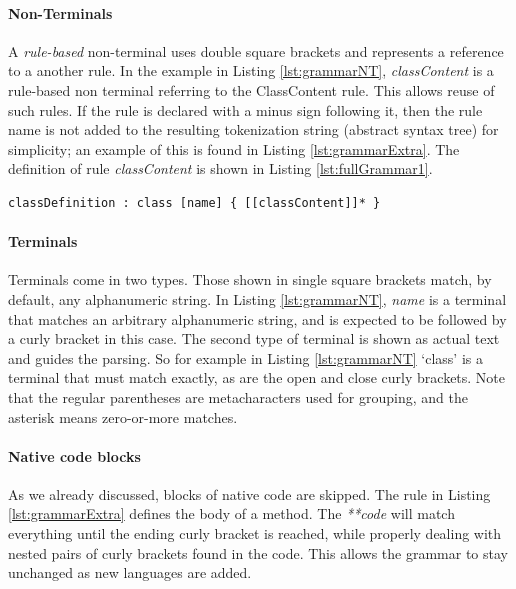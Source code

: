 \paragraph*{Non-Terminals} A \textit{rule-based} non-terminal uses double square brackets and represents a reference to a another rule. In the example in Listing \ref{lst:grammarNT}, \textit{classContent} is a rule-based non terminal referring to the ClassContent rule. This allows reuse of such rules.  If the rule is declared with a minus sign following it, then the rule name is not added to the resulting tokenization string (abstract syntax tree) for simplicity; an example of this is found in Listing \ref{lst:grammarExtra}. The definition of rule \textit{classContent} is shown in Listing \ref{lst:fullGrammar1}.


\begin{lstlisting}[language={grammar}, label=lst:grammarNT,caption=Grammar for Umple classes]
 classDefinition : class [name] { [[classContent]]* }
\end{lstlisting}

\paragraph*{Terminals} Terminals come in two types. Those shown in single square brackets match, by default, any alphanumeric string. In Listing \ref{lst:grammarNT}, \textit{name} is a terminal that matches an arbitrary alphanumeric string, and is expected to be followed by a curly bracket in this case. The second type of terminal is shown as actual text and guides the parsing. So for example in Listing \ref{lst:grammarNT} `class' is a terminal that must match exactly, as are the open and close curly brackets. Note that the regular parentheses are metacharacters used for grouping, and the asterisk means zero-or-more matches.

\paragraph*{Native code blocks}
As we already discussed, blocks of native code are skipped. The rule in Listing \ref{lst:grammarExtra} defines the body of a method. The \textit{**code}  will match everything until the ending curly bracket is reached, while properly dealing with nested pairs of curly brackets found in the code. This allows the grammar to stay unchanged as new languages are added. 

